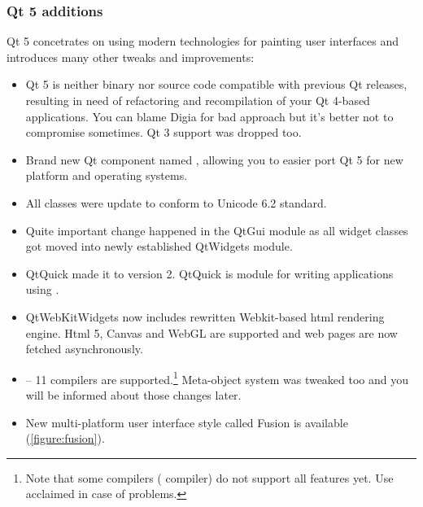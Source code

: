 \subsubsection{Qt 5 additions}
Qt 5 concetrates on using modern technologies for painting user interfaces and introduces many other tweaks and improvements:
\begin{itemize}
\item
Qt 5 is neither binary nor source code compatible with previous Qt releases, resulting in need of refactoring and recompilation of your Qt 4-based applications. You can blame Digia for bad approach but it's better not to compromise sometimes. Qt 3 support was dropped too.


\item
Brand new Qt component named , allowing you to easier port Qt 5 for new platform and operating systems.

\item
All classes were update to conform to Unicode 6.2 standard.

\item
Quite important change happened in the QtGui module as all widget classes got moved into newly established QtWidgets module.

\item
QtQuick made it to version 2. QtQuick is module for writing applications using .

\item
QtWebKitWidgets now includes rewritten Webkit-based html rendering engine. Html 5, Canvas and WebGL are supported and web pages are now fetched asynchronously.


\item
{} -- 11 compilers are supported.\footnote{Note that some compilers (\eg {} compiler) do not support all  features yet. Use acclaimed  in case of problems.} Meta-object system was tweaked too and you will be informed about those changes later.

\item
New multi-platform user interface style called Fusion is available (\autoref{figure:fusion}).
\end{itemize}

